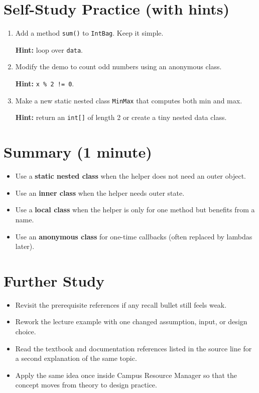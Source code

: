 \documentclass[11pt]{article}
\begin{document}
\section{Self-Study Practice (with hints)}
\begin{enumerate}
  \item Add a method \texttt{sum()} to \texttt{IntBag}. Keep it simple.\par
  \textbf{Hint:} loop over \texttt{data}.

  \item Modify the demo to count odd numbers using an anonymous class.\par
  \textbf{Hint:} \texttt{x \% 2 != 0}.

  \item Make a new static nested class \texttt{MinMax} that computes both min and max.\par
  \textbf{Hint:} return an \texttt{int[]} of length 2 or create a tiny nested data class.
\end{enumerate}

\section{Summary (1 minute)}
\begin{itemize}
  \item Use a \textbf{static nested class} when the helper does not need an outer object.
  \item Use an \textbf{inner class} when the helper needs outer state.
  \item Use a \textbf{local class} when the helper is only for one method but benefits from a name.
  \item Use an \textbf{anonymous class} for one-time callbacks (often replaced by lambdas later).
\end{itemize}

\section{Further Study}
\begin{itemize}
  \item Revisit the prerequisite references if any recall bullet still feels weak.
  \item Rework the lecture example with one changed assumption, input, or design choice.
  \item Read the textbook and documentation references listed in the source line for a second explanation of the same topic.
  \item Apply the same idea once inside Campus Resource Manager so that the concept moves from theory to design practice.
\end{itemize}
\notesources{\OOPSUnitIIISources}
\end{document}
